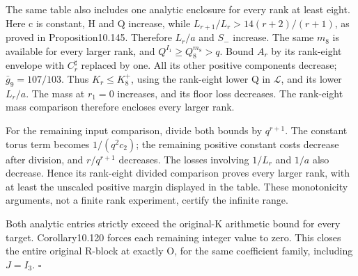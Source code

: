 \documentclass[
  11pt,
  a4paper,
]{article}
\begin{document}
The same table also includes one analytic enclosure for every rank at
least eight. Here c is constant, H and Q increase, while
\(L_{r+1}/L_r>14(r+2)/(r+1)\), as proved in Proposition10.145. Therefore
\(L_r/a\) and \(S_-\) increase. The same \(m_8\) is available for every
larger rank, and \(Q^{I_1}\ge Q_8^{m_8}>q\). Bound \(A_r\) by its
rank-eight envelope with \(C_r^\sharp\) replaced by one. All its other
positive components decrease; \(\bar g_9=107/103\). Thus
\(K_r\le K_8^+\), using the rank-eight lower Q in \(\mathcal L\), and
its lower \(L_r/a\). The mass at \(r_1=0\) increases, and its floor loss
decreases. The rank-eight mass comparison therefore encloses every
larger rank.

For the remaining input comparison, divide both bounds by \(q^{r+1}\).
The constant torus term becomes \(1/(q^2c_2)\); the remaining positive
constant costs decrease after division, and \(r/q^{r+1}\) decreases. The
losses involving \(1/L_r\) and \(1/a\) also decrease. Hence its
rank-eight divided comparison proves every larger rank, with at least
the unscaled positive margin displayed in the table. These monotonicity
arguments, not a finite rank experiment, certify the infinite range.

Both analytic entries strictly exceed the original-K arithmetic bound
for every target. Corollary10.120 forces each remaining integer value to
zero. This closes the entire original R-block at exactly O, for the same
coefficient family, including \(J=I_3\). \(\square\)
\end{document}
